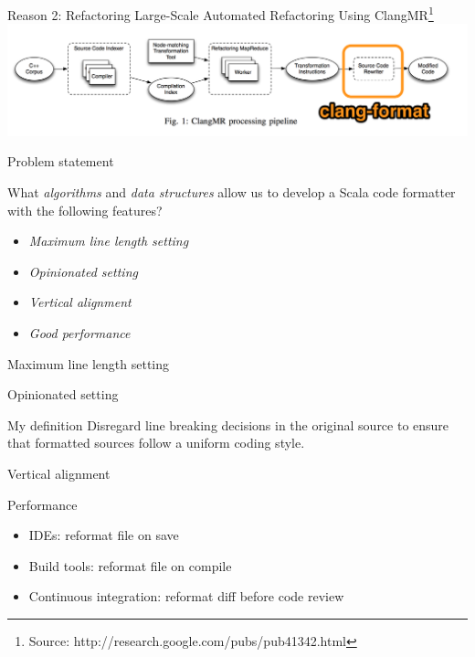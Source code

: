 \documentclass[xcolor=dvipsnames]{beamer}
\theoremstyle{definition}
\begin{document}
\begin{frame}{Reason 2: Refactoring}
  Large-Scale Automated Refactoring Using ClangMR\footnote{Source: http://research.google.com/pubs/pub41342.html}
  \includegraphics[width=\textwidth]{img/clangmr.png}
\end{frame}

\begin{frame}{Problem statement}
  \begin{block}{}
    What \emph{algorithms} and \emph{data structures} allow us to develop a
    Scala code formatter with the following features?
    \begin{itemize}
      \item \emph{Maximum line length setting}
      \item \emph{Opinionated setting}
      \item \emph{Vertical alignment}
      \item \emph{Good performance}
    \end{itemize}
  \end{block}
\end{frame}

\begin{frame}{Maximum line length setting}
  
\end{frame}

\begin{frame}{Opinionated setting}
  \begin{block}{My definition}
    Disregard line breaking decisions in the original source to ensure that
    formatted sources follow a uniform coding style.
  \end{block}
  
\end{frame}

\begin{frame}{Vertical alignment}
  
\end{frame}

\begin{frame}{Performance}
  \begin{itemize}
    \item IDEs: reformat file on save
    \item Build tools: reformat file on compile
    \item Continuous integration: reformat diff before code review
  \end{itemize}
\end{frame}
\end{document}
